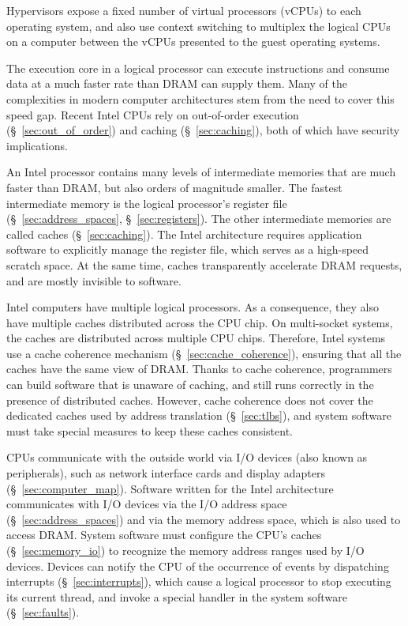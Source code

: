 Hypervisors expose a fixed number of virtual processors (vCPUs) to each
operating system, and also use context switching to multiplex the logical CPUs
on a computer between the vCPUs presented to the guest operating systems.

The execution core in a logical processor can execute instructions and consume
data at a much faster rate than DRAM can supply them. Many of the complexities
in modern computer architectures stem from the need to cover this speed gap.
Recent Intel CPUs rely on out-of-order execution (\S~\ref{sec:out_of_order})
and caching (\S~\ref{sec:caching}), both of which have security implications.

An Intel processor contains many levels of intermediate memories that are much
faster than DRAM, but also orders of magnitude smaller.  The fastest
intermediate memory is the logical processor's register file
(\S~\ref{sec:address_spaces}, \S~\ref{sec:registers}). The other intermediate
memories are called caches (\S~\ref{sec:caching}). The Intel architecture
requires application software to explicitly manage the register file, which
serves as a high-speed scratch space. At the same time, caches transparently
accelerate DRAM requests, and are mostly invisible to software.

Intel computers have multiple logical processors. As a consequence, they also
have multiple caches distributed across the CPU chip. On multi-socket systems,
the caches are distributed across multiple CPU chips. Therefore, Intel systems
use a cache coherence mechanism (\S~\ref{sec:cache_coherence}), ensuring that
all the caches have the same view of DRAM. Thanks to cache coherence,
programmers can build software that is unaware of caching, and still runs
correctly in the presence of distributed caches. However, cache coherence does
not cover the dedicated caches used by address translation (\S~\ref{sec:tlbs}),
and system software must take special measures to keep these caches consistent.

CPUs communicate with the outside world via I/O devices (also known as
peripherals), such as network interface cards and display adapters
(\S~\ref{sec:computer_map}). Software written for the Intel architecture
communicates with I/O devices via the I/O address space
(\S~\ref{sec:address_spaces}) and via the memory address space, which is also
used to access DRAM. System software must configure the CPU's caches
(\S~\ref{sec:memory_io}) to recognize the memory address ranges used by I/O
devices. Devices can notify the CPU of the occurrence of events by dispatching
interrupts (\S~\ref{sec:interrupts}), which cause a logical processor to stop
executing its current thread, and invoke a special handler in the system
software (\S~\ref{sec:faults}).

